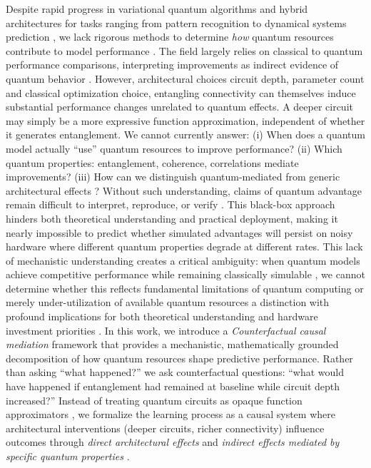 \documentclass[
    reprint,
    amsmath, amssymb,
    aps,
    floatfix,
    nofootinbib
]{revtex4-1}
\begin{document}
Despite rapid progress in variational quantum algorithms and hybrid architectures for tasks ranging from pattern recognition to dynamical systems prediction \cite{cerezo2022challenges}, we lack rigorous methods to determine \emph{how} quantum resources contribute to model performance \cite{schuld2022quantum}. The field largely relies on classical to quantum performance comparisons, interpreting improvements as indirect evidence of quantum behavior \cite{huang2022quantum, huang2021power}. However, architectural choices circuit depth, parameter count and classical optimization choice, entangling connectivity \cite{sim2019expressibility, zhang2025machine} can themselves induce substantial performance changes \cite{hubregtsen2021evaluation} unrelated to quantum effects. A deeper circuit may simply be a more expressive function approximation, independent of whether it generates entanglement. We cannot currently answer: (i) When does a quantum model actually ``use'' quantum resources to improve performance? (ii) Which quantum properties:  entanglement, coherence, correlations mediate improvements? (iii) How can we distinguish quantum-mediated from generic architectural effects \cite{sim2019expressibility}?
Without such understanding, claims of quantum advantage remain difficult to interpret, reproduce, or verify \cite{schuld2022quantum}. This black-box approach hinders both theoretical understanding and practical deployment, making it nearly impossible to predict whether simulated advantages will persist on noisy hardware where different quantum properties degrade at different rates. This lack of mechanistic understanding creates a critical ambiguity: when quantum models achieve competitive performance while remaining classically simulable \cite{bermejo2024quantum,bowles2024better}, we cannot determine whether this reflects fundamental limitations of quantum computing or merely under-utilization of available quantum resources a distinction with profound implications for both theoretical understanding and hardware investment priorities \cite{schuld2022quantum,huang2021power}.
In this work, we introduce a \emph{Counterfactual  causal mediation} \cite{imai2010general, peters2017elements} framework that provides a mechanistic, mathematically grounded decomposition of how quantum resources shape predictive performance. Rather than asking ``what happened?'' we ask counterfactual questions: ``what would have happened if entanglement had remained at baseline while circuit depth increased?'' Instead of treating quantum circuits as opaque function approximators \cite{cerezo2022challenges}, we formalize the learning process as a causal system\cite{scholkopf2021toward} where architectural interventions (deeper circuits, richer connectivity) influence outcomes through \emph{direct architectural effects} and \emph{indirect effects mediated by specific quantum properties} \cite{zhang2025machine}.
\end{document}
